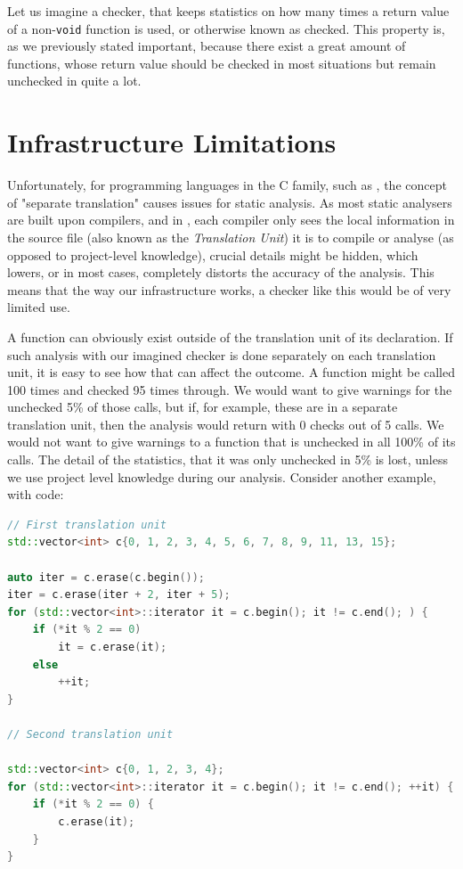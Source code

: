 Let us imagine a checker, that keeps statistics on how many times a return value of a non-\lstinline{void} function is used, or otherwise known
as checked. This property is, as we previously stated important, because there exist a great amount of functions,
whose return value should be checked in most situations but remain unchecked in quite a lot.

\section{Infrastructure Limitations}

Unfortunately, for programming languages in the C family, such as \CC{}, the concept of "separate translation" causes issues for static
analysis. As most static analysers are built upon compilers, and in \CC{}, each compiler only sees the local information in the source file
(also known as the \emph{Translation Unit}) it is to compile or analyse (as opposed to project-level knowledge), crucial details
might be hidden, which lowers, or in most cases, completely distorts the accuracy of the analysis.
This means that the way our infrastructure works, a checker like this would be of very limited use.

A function can obviously exist outside of the translation unit of its declaration. If such analysis with our imagined checker is done
separately on each translation unit, it is easy to see how that can affect the outcome. A function might be called 100 times and 
checked 95 times through. We would want to give warnings for the unchecked 5\% of those calls, but if, for example, these are in a 
separate translation unit, then the analysis would return with 0 checks out of 5 calls. We would not want to give warnings to a
function that is unchecked in all 100\% of its calls. The detail of the statistics, that it was only unchecked in 5\% is lost,
unless we use project level knowledge during our analysis. Consider another example, with code:


\begin{lstlisting}[language={C++},caption={An example of the infrastructure's limitations.},label={lst:motivation example}]
// First translation unit
std::vector<int> c{0, 1, 2, 3, 4, 5, 6, 7, 8, 9, 11, 13, 15};

auto iter = c.erase(c.begin());
iter = c.erase(iter + 2, iter + 5);
for (std::vector<int>::iterator it = c.begin(); it != c.end(); ) {
    if (*it % 2 == 0)
        it = c.erase(it);
    else
        ++it;
}

// Second translation unit

std::vector<int> c{0, 1, 2, 3, 4};
for (std::vector<int>::iterator it = c.begin(); it != c.end(); ++it) {
    if (*it % 2 == 0) {
        c.erase(it);
    }
}
\end{lstlisting}


